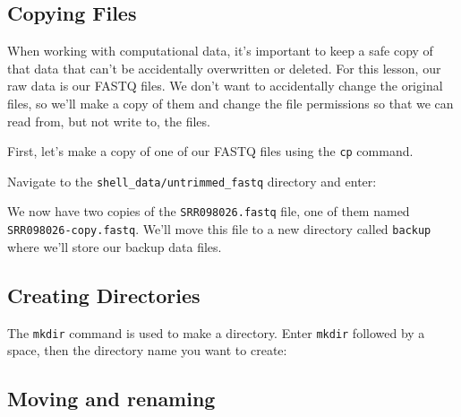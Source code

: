\documentclass[
  letterpaper,
  DIV=11,
  numbers=noendperiod]{scrreprt}
\newenvironment{Shaded}{\begin{snugshade}}{\end{snugshade}}
\newcommand{\AttributeTok}[1]{\textcolor[rgb]{0.40,0.45,0.13}{#1}}
\newcommand{\ExtensionTok}[1]{\textcolor[rgb]{0.00,0.23,0.31}{#1}}
\newcommand{\NormalTok}[1]{\textcolor[rgb]{0.00,0.23,0.31}{#1}}
\begin{document}
\subsection{Copying Files}\label{copying-files}

When working with computational data, it's important to keep a safe copy
of that data that can't be accidentally overwritten or deleted. For this
lesson, our raw data is our FASTQ files. We don't want to accidentally
change the original files, so we'll make a copy of them and change the
file permissions so that we can read from, but not write to, the files.

First, let's make a copy of one of our FASTQ files using the \texttt{cp}
command.

Navigate to the \texttt{shell\_data/untrimmed\_fastq} directory and
enter:

\begin{Shaded}
\end{Shaded}

We now have two copies of the \texttt{SRR098026.fastq} file, one of them
named \texttt{SRR098026-copy.fastq}. We'll move this file to a new
directory called \texttt{backup} where we'll store our backup data
files.

\subsection{Creating Directories}\label{creating-directories}

The \texttt{mkdir} command is used to make a directory. Enter
\texttt{mkdir} followed by a space, then the directory name you want to
create:

\begin{Shaded}
\end{Shaded}

\subsection{Moving and renaming}\label{moving-and-renaming}
\end{document}
